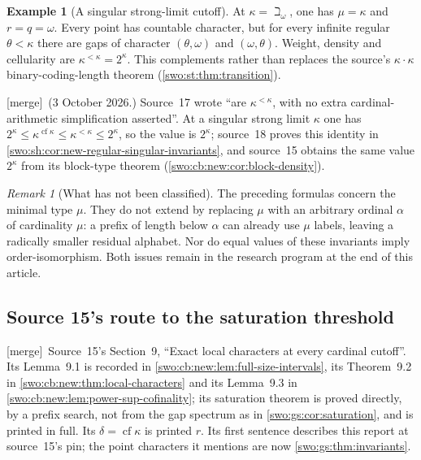 \documentclass[11pt]{article}
\theoremstyle{definition}
\newtheorem{example}[example]{Example}
\theoremstyle{remark}
\newtheorem{remark}[remark]{Remark}
\newcommand{\cf}{\operatorname{cf}}
\newcommand{\merge}{\textsf{[merge]}}
\begin{document}
\begin{example}[A singular strong-limit cutoff]\label{swo:gs:n6.8}
At $\kappa=\beth_\omega$, one has $\mu=\kappa$ and $r=q=\omega$.
Every point has countable character, but for every infinite regular
$\theta<\kappa$ there are gaps of character $(\theta,\omega)$ and
$(\omega,\theta)$. Weight, density and cellularity are
$\kappa^{<\kappa}=2^\kappa$. This complements rather than replaces the
source's $\kappa\cdot\kappa$ binary-coding-length theorem
(\cref{swo:st:thm:transition}).

\smallskip\noindent\merge\ (3 October 2026.) Source~17 wrote ``are
$\kappa^{<\kappa}$, with no extra cardinal-arithmetic simplification
asserted''. At a singular strong limit $\kappa$ one has
$2^\kappa\le\kappa^{\cf\kappa}\le\kappa^{<\kappa}\le2^\kappa$, so the value
is $2^\kappa$; source~18 proves this identity in
\cref{swo:sh:cor:new-regular-singular-invariants}, and source~15 obtains the
same value $2^\kappa$ from its block-type theorem
(\cref{swo:cb:new:cor:block-density}).
\end{example}

\begin{remark}[What has not been classified]\label{swo:gs:n6.9}
The preceding formulas concern the minimal type $\mu$. They do not extend
by replacing $\mu$ with an arbitrary ordinal $\alpha$ of cardinality
$\mu$: a prefix of length below $\alpha$ can already use $\mu$ labels,
leaving a radically smaller residual alphabet. Nor do equal values of
these invariants imply order-isomorphism. Both issues remain in the
research program at the end of this article.
\end{remark}

\subsection{Source 15's route to the saturation threshold}\label{swo:cb:new:sec:local-geometry}

\merge\ Source~15's Section~9, ``Exact local characters at every cardinal
cutoff''. Its Lemma~9.1 is recorded in
\cref{swo:cb:new:lem:full-size-intervals}, its Theorem~9.2 in
\cref{swo:cb:new:thm:local-characters} and its Lemma~9.3 in
\cref{swo:cb:new:lem:power-sup-cofinality};
its saturation theorem is proved directly, by a prefix search, not from the
gap spectrum as in \cref{swo:gs:cor:saturation}, and is printed in full. Its
$\delta=\cf\kappa$ is printed $r$. Its first sentence describes this report at
source~15's pin; the point characters it mentions are now
\cref{swo:gs:thm:invariants}.
\end{document}
